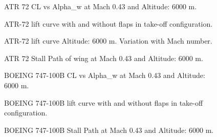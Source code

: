 \begin{figure}[H]
\centering

\caption{ATR 72 CL vs Alpha_w at Mach 0.43 and Altitude: 6000 m.}
\label{fig:clATR}
\end{figure}

\begin{figure}[H]
\centering

\caption{ATR-72 lift curve with and without flaps in take-off configuration.}
\label{fig:clATR}
\end{figure}

\begin{figure}[H]
\centering

\caption{ATR-72 lift curve Altitude: 6000 m. Variation with Mach number.}
\label{fig:clATR}
\end{figure}


\begin{figure}[H]
\centering

\caption{ATR 72 Stall Path of wing at Mach 0.43 and Altitude: 6000 m.}
\label{fig:stallATR}
\end{figure}

\begin{figure}[H]
\centering

\caption{BOEING 747-100B CL vs Alpha_w at Mach 0.43 and Altitude: 6000 m.}
\label{fig:clB}
\end{figure}

\begin{figure}[H]
\centering

\caption{BOEING 747-100B  lift curve with and without flaps in take-off configuration.}
\label{fig:clATR}
\end{figure}

\begin{figure}[H]
\centering

\caption{BOEING 747-100B Stall Path at Mach 0.43 and Altitude: 6000 m.}
\label{fig:stallB}
\end{figure}



	 	 

